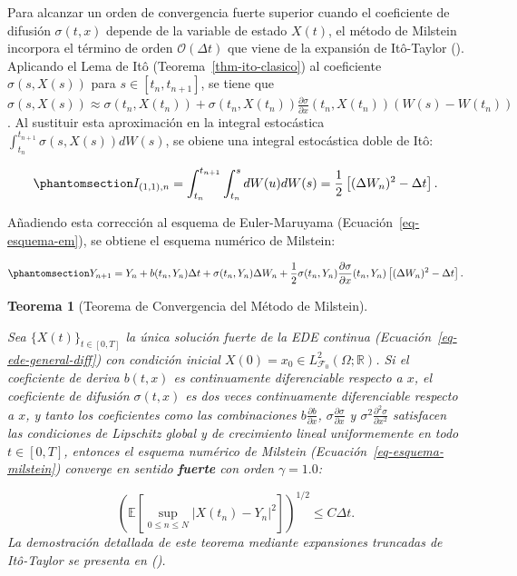 \documentclass[
  spanish,
  us-letterpaper,
]{scrreprt}
\numberwithin{equation}{section}
\theoremstyle{plain}
\newtheorem{theorem}{Teorema}[chapter]
\theoremstyle{plain}
\theoremstyle{plain}
\theoremstyle{definition}
\theoremstyle{remark}
\begin{document}
Para alcanzar un orden de convergencia fuerte superior cuando el
coeficiente de difusión \(\sigma(t, x)\) depende de la variable de
estado \(X(t)\), el método de Milstein incorpora el término de orden
\(\mathcal{O}(\Delta t)\) que viene de la expansión de Itô-Taylor
(). Aplicando
el Lema de Itô (Teorema~\ref{thm-ito-clasico}) al coeficiente
\(\sigma(s, X(s))\) para \(s \in [t_n, t_{n+1}]\), se tiene que
\(\displaystyle \sigma(s, X(s)) \approx \sigma(t_n, X(t_n)) + \sigma(t_n, X(t_n))\frac{\partial \sigma}{\partial x}(t_n, X(t_n))(W(s) - W(t_n))\).
Al sustituir esta aproximación en la integral estocástica
\(\displaystyle \int_{t_n}^{t_{n+1}} \sigma(s, X(s)) dW(s)\), se obiene
una integral estocástica doble de Itô:

\begin{equation}\phantomsection\label{eq-integral-doble-milstein}{
I_{(1,1), n} = \int_{t_n}^{t_{n+1}} \int_{t_n}^s dW(u) dW(s) = \frac{1}{2}\left[ (\Delta W_n)^2 - \Delta t \right].
}\end{equation}

Añadiendo esta corrección al esquema de Euler-Maruyama
(Ecuación~\ref{eq-esquema-em}), se obtiene el esquema numérico de
Milstein:

\begin{equation}\phantomsection\label{eq-esquema-milstein}{
Y_{n+1} = Y_n + b(t_n, Y_n)\Delta t + \sigma(t_n, Y_n)\Delta W_n + \frac{1}{2}\sigma(t_n, Y_n)\frac{\partial \sigma}{\partial x}(t_n, Y_n)\left[ (\Delta W_n)^2 - \Delta t \right].
}\end{equation}

\begin{theorem}[Teorema de Convergencia del Método de
Milstein]\protect\hypertarget{thm-milstein}{}\label{thm-milstein}

Sea \(\{X(t)\}_{t \in [0, T]}\) la única solución fuerte de la EDE
continua (Ecuación~\ref{eq-ede-general-diff}) con condición inicial
\(X(0) = x_0 \in L^2_{\mathcal{F}_0}(\Omega; \mathbb{R})\). Si el
coeficiente de deriva \(b(t, x)\) es continuamente diferenciable
respecto a \(x\), el coeficiente de difusión \(\sigma(t, x)\) es dos
veces continuamente diferenciable respecto a \(x\), y tanto los
coeficientes como las combinaciones
\(\displaystyle b\frac{\partial b}{\partial x}\),
\(\displaystyle \sigma\frac{\partial \sigma}{\partial x}\) y
\(\displaystyle \sigma^2\frac{\partial^2 \sigma}{\partial x^2}\)
satisfacen las condiciones de Lipschitz global y de crecimiento lineal
uniformemente en todo \(t \in [0, T]\), entonces el esquema numérico de
Milstein (Ecuación~\ref{eq-esquema-milstein}) converge en sentido
\textbf{fuerte} con orden \(\gamma = 1.0\):

\[
\left( \mathbb{E}\left[ \sup_{0 \le n \le N} \vert X(t_n) - Y_n \vert^2 \right] \right)^{1/2} \le C \Delta t.
\] La demostración detallada de este teorema mediante expansiones
truncadas de Itô-Taylor se presenta en
().

\end{theorem}
\end{document}
